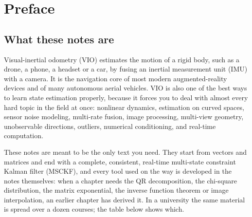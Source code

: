 \chapter{Preface}

\section*{What these notes are}

Visual-inertial odometry (VIO) estimates the motion of a rigid body, such as a drone, a phone, a
headset or a car, by fusing an inertial measurement unit (IMU) with a camera. It is the
navigation core of most modern augmented-reality devices and of many autonomous aerial
vehicles. VIO is also one of the best ways to learn state estimation properly, because it forces
you to deal with almost every hard topic in the field at once: nonlinear dynamics, estimation on
curved spaces, sensor noise modeling, multi-rate fusion, image processing, multi-view geometry,
unobservable directions, outliers, numerical conditioning, and real-time computation.

These notes are meant to be the only text you need. They start from vectors and matrices and end with a complete,
consistent, real-time multi-state constraint Kalman filter (MSCKF), and every tool used on the way is developed in
the notes themselves: when a chapter needs the QR decomposition, the chi-square distribution, the matrix exponential,
the inverse function theorem or image interpolation, an earlier chapter has derived it. In a university the same
material is spread over a dozen courses; the table below shows which.

